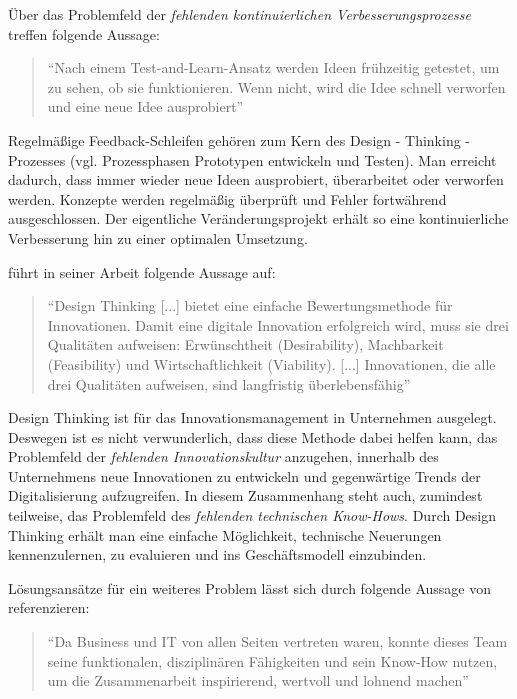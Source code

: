 Über das Problemfeld der \textit{fehlenden kontinuierlichen Verbesserungsprozesse} treffen  folgende Aussage:

\begin{quote}
	``Nach einem Test-and-Learn-Ansatz werden Ideen frühzeitig getestet, um zu sehen, ob sie funktionieren. Wenn nicht, wird die Idee schnell verworfen und eine neue Idee ausprobiert'' \cite[S. 369]{urbach_digitalization_2018}
\end{quote}

Regelmäßige Feedback-Schleifen gehören zum Kern des Design - Thinking - Prozesses (vgl. Prozessphasen Prototypen entwickeln und Testen). Man erreicht dadurch, dass immer wieder neue Ideen ausprobiert, überarbeitet oder verworfen werden. Konzepte werden regelmäßig überprüft und Fehler fortwährend ausgeschlossen. Der eigentliche Veränderungsprojekt erhält so eine kontinuierliche Verbesserung hin zu einer optimalen Umsetzung.

 führt in seiner Arbeit folgende Aussage auf:

\begin{quote}
	``Design Thinking [...] bietet eine einfache Bewertungsmethode für Innovationen. Damit eine digitale Innovation erfolgreich wird, muss sie drei Qualitäten aufweisen: Erwünschtheit (Desirability), Machbarkeit (Feasibility) und Wirtschaftlichkeit (Viability). [...] Innovationen, die alle drei Qualitäten aufweisen, sind langfristig überlebensfähig'' \cite[S. 207f.]{weinreich_lean_2016}
\end{quote}

Design Thinking ist für das Innovationsmanagement in Unternehmen ausgelegt. Deswegen ist es nicht verwunderlich, dass diese Methode dabei helfen kann, das Problemfeld der \textit{fehlenden Innovationskultur} anzugehen, innerhalb des Unternehmens neue Innovationen zu entwickeln und gegenwärtige Trends der Digitalisierung aufzugreifen. In diesem Zusammenhang steht auch, zumindest teilweise, das Problemfeld des \textit{fehlenden technischen Know-Hows}. Durch Design Thinking erhält man eine einfache Möglichkeit, technische Neuerungen kennenzulernen, zu evaluieren und ins Geschäftsmodell einzubinden.

Lösungsansätze für ein weiteres Problem lässt sich durch folgende Aussage von  referenzieren:

\begin{quote}
	``Da Business und IT von allen Seiten vertreten waren, konnte dieses Team seine funktionalen, disziplinären Fähigkeiten und sein Know-How nutzen, um die Zusammenarbeit inspirierend, wertvoll und lohnend machen'' \cite[S. 215]{oswald_shaping_2017}
\end{quote}

